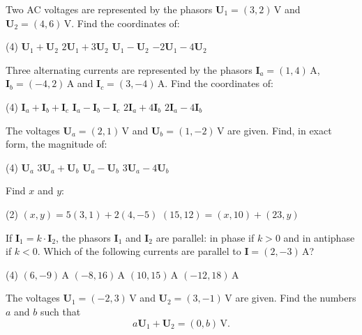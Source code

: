 Two AC voltages are represented by the phasors $\mathbf{U}_1 = (3, 2)\,\text{V}$ and
$\mathbf{U}_2 = (4, 6)\,\text{V}$. Find the coordinates of:
\begin{delar}(4)
  \task $\mathbf{U}_1 + \mathbf{U}_2$
  \task $2\mathbf{U}_1 + 3\mathbf{U}_2$
  \task $\mathbf{U}_1 - \mathbf{U}_2$
  \task $-2\mathbf{U}_1 - 4\mathbf{U}_2$
\end{delar}

Three alternating currents are represented by the phasors $\mathbf{I}_a = (1, 4)\,\text{A}$,
$\mathbf{I}_b = (-4, 2)\,\text{A}$ and $\mathbf{I}_c = (3, -4)\,\text{A}$. Find the
coordinates of:
\begin{delar}(4)
  \task $\mathbf{I}_a + \mathbf{I}_b + \mathbf{I}_c$
  \task $\mathbf{I}_a - \mathbf{I}_b - \mathbf{I}_c$
  \task $2\mathbf{I}_a + 4\mathbf{I}_b$
  \task $2\mathbf{I}_a - 4\mathbf{I}_b$
\end{delar}

The voltages $\mathbf{U}_a = (2, 1)\,\text{V}$ and $\mathbf{U}_b = (1, -2)\,\text{V}$ are
given. Find, in exact form, the magnitude of:
\begin{delar}(4)
  \task $\mathbf{U}_a$
  \task $3\mathbf{U}_a + \mathbf{U}_b$
  \task $\mathbf{U}_a - \mathbf{U}_b$
  \task $3\mathbf{U}_a - 4\mathbf{U}_b$
\end{delar}

Find $x$ and $y$:
\begin{delar}(2)
  \task $(x, y) = 5(3, 1) + 2(4, -5)$
  \task $(15, 12) = (x, 10) + (23, y)$
\end{delar}

If $\mathbf{I}_1 = k \cdot \mathbf{I}_2$, the phasors $\mathbf{I}_1$ and $\mathbf{I}_2$ are
parallel: in phase if $k > 0$ and in antiphase if $k < 0$. Which of the following currents are
parallel to $\mathbf{I} = (2, -3)\,\text{A}$?
\begin{delar}(4)
  \task $(6, -9)\,\text{A}$
  \task $(-8, 16)\,\text{A}$
  \task $(10, 15)\,\text{A}$
  \task $(-12, 18)\,\text{A}$
\end{delar}

The voltages $\mathbf{U}_1 = (-2, 3)\,\text{V}$ and $\mathbf{U}_2 = (3, -1)\,\text{V}$ are
given. Find the numbers $a$ and $b$ such that
\[
  a\mathbf{U}_1 + \mathbf{U}_2 = (0, b)\,\text{V}.
\]

